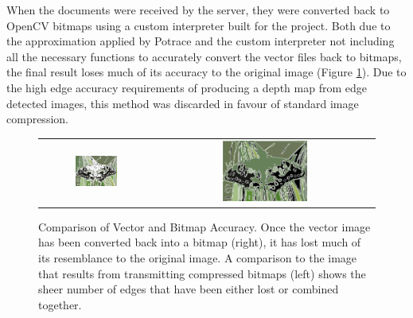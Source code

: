 When the documents were received by the server, they were converted back to OpenCV bitmaps using a custom interpreter built for the project. Both due to the approximation applied by Potrace and the custom interpreter not including all the necessary functions to accurately convert the vector files back to bitmaps, the final result loses much of its accuracy to the original image (Figure \ref{fig:potracecomp}). Due to the high edge accuracy requirements of producing a depth map from edge detected images, this method was discarded in favour of standard image compression. 

\begin{figure}[H]
    \begin{center}
    \begin{tabular}{ c c }
        \includegraphics[width=0.4\textwidth]{Figures/buttercan.jpg} &
        \includegraphics[width=0.4\textwidth]{Figures/butterred.jpg}
    \end{tabular}
    \caption[Comparison of Vector and Bitmap Accuracy]{Comparison of Vector and Bitmap Accuracy. Once the vector image has been converted back into a bitmap (right), it has lost much of its resemblance to the original image. A comparison to the image that results from transmitting compressed bitmaps (left) shows the sheer number of edges that have been either lost or combined together.}
    \label{fig:potracecomp}
    \end{center}
\end{figure}